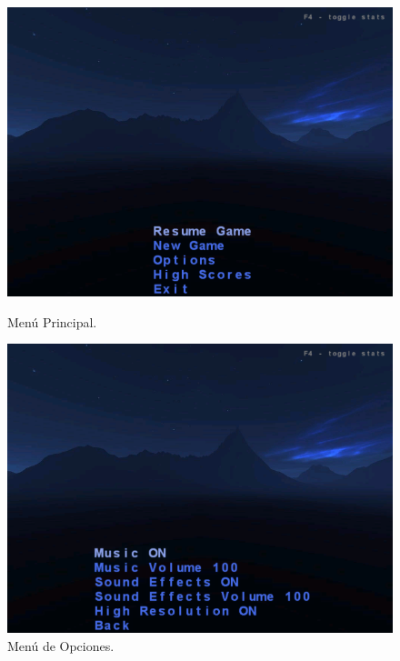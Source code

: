 \documentclass[a4paper,10pt]{article}
\begin{document}
\begin{figure}
\begin{minipage}[b]{0.5\linewidth}
\centering
 \includegraphics[scale=0.250]{./main_menu.png}
 \caption{Menú Principal.}
\label{fig:figure0}
\end{minipage}
\hspace{0.5cm}
\begin{minipage}[b]{0.5\linewidth}
\centering
 \includegraphics[scale=0.250]{./options_menu.png}
 \caption{Menú de Opciones.}
\label{fig:figure00}
\end{minipage}
\end{figure}
\end{document}
